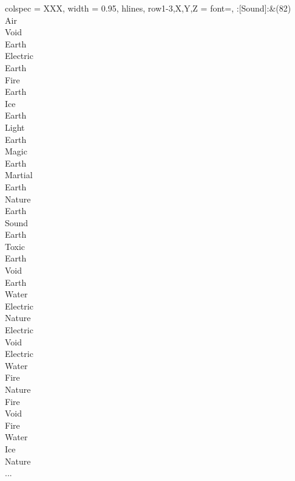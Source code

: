 \begin{longtblr}[
	caption = {2v1 Defending Resisted},
	label = {2v1-Defending-Resisted},
]{
	colspec = {XXX}, width = 0.95\linewidth,
	hlines,
	row{1-3,X,Y,Z} = {font=\bfseries},
}
	:[Sound]:&{(82)\\
	Air \\
	Void \\
	Earth \\
	Electric \\
	Earth \\
	Fire \\
	Earth \\
	Ice \\
	Earth \\
	Light \\
	Earth \\
	Magic \\
	Earth \\
	Martial \\
	Earth \\
	Nature \\
	Earth \\
	Sound \\
	Earth \\
	Toxic \\
	Earth \\
	Void \\
	Earth \\
	Water \\
	Electric \\
	Nature \\
	Electric \\
	Void \\
	Electric \\
	Water \\
	Fire \\
	Nature \\
	Fire \\
	Void \\
	Fire \\
	Water \\
	Ice \\
	Nature \\
	...\\
	}\\


\end{longtblr}

